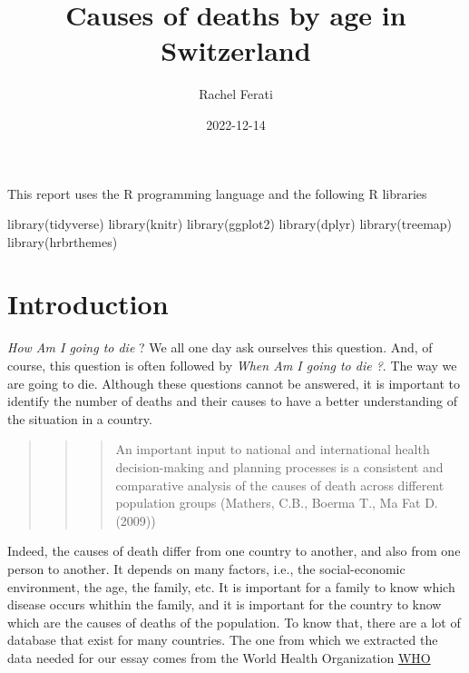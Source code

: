 \documentclass[
]{article}
\title{Causes of deaths by age in Switzerland}
\author{Rachel Ferati}
\date{2022-12-14}
\newenvironment{Shaded}{\begin{snugshade}}{\end{snugshade}}
\newcommand{\FunctionTok}[1]{\textcolor[rgb]{0.00,0.00,0.00}{#1}}
\newcommand{\NormalTok}[1]{#1}
\begin{document}
\maketitle

{
\setcounter{tocdepth}{2}
\tableofcontents
}
This report uses the R programming language and the following R
libraries

\begin{Shaded}
\begin{Highlighting}[]
\FunctionTok{library}\NormalTok{(tidyverse)}
\FunctionTok{library}\NormalTok{(knitr)}
\FunctionTok{library}\NormalTok{(ggplot2)}
\FunctionTok{library}\NormalTok{(dplyr)}
\FunctionTok{library}\NormalTok{(treemap)}
\FunctionTok{library}\NormalTok{(hrbrthemes)}
\end{Highlighting}
\end{Shaded}

\hypertarget{introduction}{%
\section{Introduction}\label{introduction}}

\emph{How Am I going to die} ? We all one day ask ourselves this
question. And, of course, this question is often followed by \emph{When
Am I going to die ?}. The way we are going to die. Although these
questions cannot be answered, it is important to identify the number of
deaths and their causes to have a better understanding of the situation
in a country.

\begin{quote}
\begin{quote}
\begin{quote}
An important input to national and international health decision-making
and planning processes is a consistent and comparative analysis of the
causes of death across different population groups (Mathers, C.B.,
Boerma T., Ma Fat D. (2009))
\end{quote}
\end{quote}
\end{quote}

Indeed, the causes of death differ from one country to another, and also
from one person to another. It depends on many factors, i.e., the
social-economic environment, the age, the family, etc. It is important
for a family to know which disease occurs whithin the family, and it is
important for the country to know which are the causes of deaths of the
population. To know that, there are a lot of database that exist for
many countries. The one from which we extracted the data needed for our
essay comes from the World Health Organization
\href{@https://www.who.int/data/gho/data/themes/mortality-and-global-health-estimates/ghe-leading-causes-of-death}{WHO}
\end{document}
